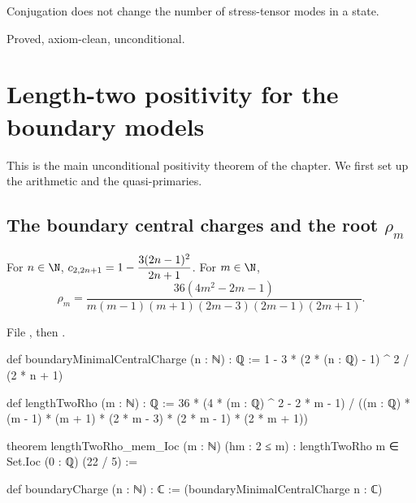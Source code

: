 \begin{physics}
Conjugation does not change the number of stress-tensor modes in a state.
\end{physics}

\begin{status}
Proved, axiom-clean, unconditional.
\end{status}

\section{Length-two positivity for the boundary models}\label{l19:sec:lengthtwo}

This is the main unconditional positivity theorem of the chapter. We first set up the arithmetic
and the quasi-primaries.

\subsection{The boundary central charges and the root \texorpdfstring{$\rho_m$}{rho m}}

\begin{definition}\label{l19:def:boundarycharge}
For $n\in\N$, $c_{2,2n+1} = 1-\dfrac{3(2n-1)^2}{2n+1}$. For $m\in\N$,
\begin{equation*}
 \rho_m = \frac{36(4m^2-2m-1)}{m(m-1)(m+1)(2m-3)(2m-1)(2m+1)}.
\end{equation*}
\end{definition}

\noindent File , then
.
\begin{leancode}
def boundaryMinimalCentralCharge (n : ℕ) : ℚ :=
  1 - 3 * (2 * (n : ℚ) - 1) ^ 2 / (2 * n + 1)

def lengthTwoRho (m : ℕ) : ℚ :=
  36 * (4 * (m : ℚ) ^ 2 - 2 * m - 1) /
    ((m : ℚ) * (m - 1) * (m + 1) * (2 * m - 3) * (2 * m - 1) * (2 * m + 1))

theorem lengthTwoRho_mem_Ioc (m : ℕ) (hm : 2 ≤ m) :
    lengthTwoRho m ∈ Set.Ioc (0 : ℚ) (22 / 5) :=

def boundaryCharge (n : ℕ) : ℂ := (boundaryMinimalCentralCharge n : ℂ)
\end{leancode}

